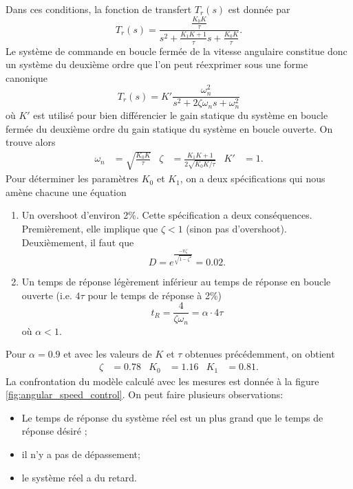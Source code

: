 \documentclass[frenchb, paper=a4, fontsize=11pt]{scrartcl}
\numberwithin{equation}{section}					%
\numberwithin{figure}{section}					%
\numberwithin{table}{section}						%
\begin{document}
Dans ces conditions, la fonction de transfert $T_r(s)$ est donnée
par
\begin{equation}
	T_r(s) = \frac{\frac{K_0K}{\tau}}{s^2 +\frac{K_1K+1}{\tau}s + \frac{K_0K}{\tau}}.
\end{equation}
Le système de commande en boucle fermée de la vitesse angulaire
constitue donc un système du deuxième ordre que l'on peut réexprimer
sous une forme canonique
\begin{equation}
	T_r(s) = K'\frac{\omega_n^2}{s^2 + 2\zeta\omega_n s+ \omega_n^2}
\end{equation}
où $K'$ est utilisé pour bien différencier le gain statique du système en
boucle fermée du deuxième ordre du gain statique du système en boucle
ouverte. On trouve alors
\begin{align}
	\omega_n & = \sqrt{\frac{K_0K}{\tau}} & \zeta & = \frac{K_1K + 1}{2\sqrt{K_0K/\tau}}
	& K' & = 1.
\end{align}
Pour déterminer les paramètres $K_0$ et $K_1$, on a deux spécifications
qui nous amène chacune une équation
\begin{enumerate}
	\item Un overshoot d'environ 2\%. Cette spécification a deux conséquences.
	Premièrement, elle implique que $\zeta < 1$ (sinon pas d'overshoot). Deuxièmement,
	il faut que
	\begin{equation}
		D = e^{\frac{-\pi\zeta}{\sqrt{1-\zeta^2}}} = 0.02.
	\end{equation}
	\item Un temps de réponse légèrement inférieur au temps de réponse en boucle
	ouverte (i.e. $4\tau$ pour le temps de réponse à 2\%)
	\begin{equation}
		t_R = \frac{4}{\zeta\omega_n} = \alpha \cdot 4\tau
	\end{equation}
	où $\alpha < 1$.
\end{enumerate}
Pour $\alpha = 0.9$ et avec les valeurs de $K$ et $\tau$ obtenues précédemment,
on obtient
\begin{align}
	\zeta & = 0.78 & K_0 & = 1.16 & K_1 & = 0.81.
\end{align}
La confrontation du modèle calculé avec les mesures est donnée à la
figure \ref{fig:angular_speed_control}. On peut faire plusieurs
observations:
\begin{itemize}
	\item Le temps de réponse du système réel est un plus grand que le temps
	de réponse désiré ;
	\item il n'y a pas de dépassement;
	\item le système réel a du retard.
\end{itemize}
\end{document}
